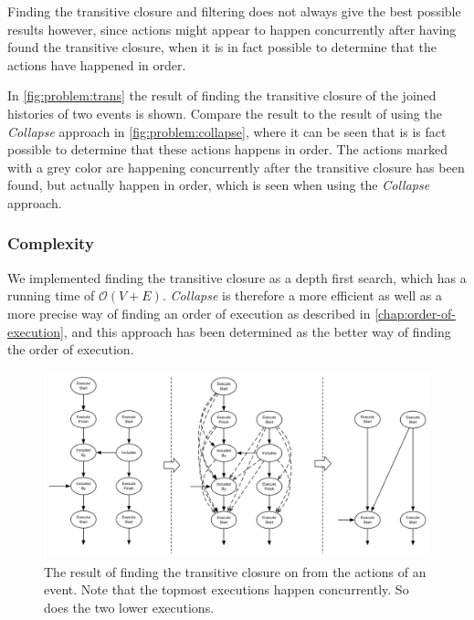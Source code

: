 	\newpar Finding the transitive closure and filtering does not always give the best possible results however, since actions might appear to happen concurrently after having found the transitive closure, when it is in fact possible to determine that the actions have happened in order. 
	
	\newpar In \autoref{fig:problem:trans} the result of finding the transitive closure of the joined histories of two events is shown. 
	Compare the result to the result of using the \textit{Collapse} approach in \autoref{fig:problem:collapse}, where it can be seen that is is fact possible to determine that these actions happens in order.
	The actions marked with a grey color are happening concurrently after the transitive closure has been found, but actually happen in order, which is seen when using the \textit{Collapse} approach.
	
	\subsubsection{Complexity}
	We implemented finding the transitive closure as a depth first search, which has a running time of $\mathcal{O}(V + E)$. \textit{Collapse} is therefore a more efficient as well as a more precise way of finding an order of execution as described in \autoref{chap:order-of-execution}, and this approach has been determined as the better way of finding the order of execution.
	
	\begin{figure}
		\centering
		\includegraphics[width=\textwidth]{6orderofexecution/images/trans.pdf}
		\caption{The result of finding the transitive closure on from the actions of an event. Note that the topmost executions happen concurrently. So does the two lower executions.}
		\label{fig:problem:trans}
	\end{figure}
	

